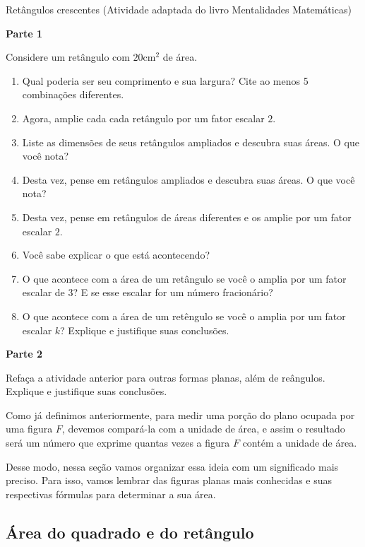 \begin{task}{Retângulos crescentes}
(Atividade adaptada do livro Mentalidades Matemáticas)

\textbf{Parte 1}

Considere um retângulo com $20\text{cm}^2$ de área.

\begin{enumerate}
  \item Qual poderia ser seu comprimento e sua largura? Cite ao menos 5 combinações diferentes.
  \item Agora, amplie cada cada retângulo por um fator escalar $2$.
  \item Liste as dimensões de seus retângulos ampliados e descubra suas áreas. O que você nota?
  \item Desta vez, pense em retângulos ampliados e descubra suas áreas. O que você nota?
  \item Desta vez, pense em retângulos de áreas diferentes e os amplie por um fator escalar $2$.
  \item Você sabe explicar o que está acontecendo?
  \item O que acontece com a área de um retângulo se você o amplia por um fator escalar de 3? E se esse escalar for um número fracionário?
  \item O que acontece com a área de um retêngulo se você o amplia por um fator escalar $k$? Explique e justifique suas conclusões.
\end{enumerate}

\textbf{Parte 2}

Refaça a atividade anterior para outras formas planas, além de reângulos. Explique e justifique suas conclusões.
\end{task}


Como já definimos anteriormente, para medir uma porção do plano ocupada por uma figura $F$, devemos compará-la com a unidade de área, e assim o resultado será um número que exprime quantas vezes a figura $F$ contém a unidade de área.

Desse modo, nessa seção vamos organizar essa ideia com um significado mais preciso. Para isso, vamos lembrar das figuras planas mais conhecidas e suas respectivas fórmulas para determinar a sua área.


\subsection{Área do quadrado e do retângulo}

